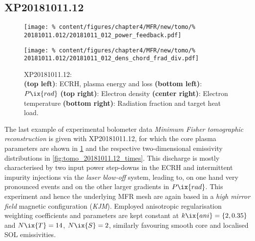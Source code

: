         \subsection*{XP20181011.12}%
%
            \begin{figure}[t]%
                \centering%
                \captionsetup{width=0.49\textwidth}%
                \begin{minipage}[c]{0.49\textwidth}%
                    \centering%
                    \texttt{[image: \%
                        content/figures/chapter4/MFR/new/tomo/\%
                        20181011.012/20181011\_012\_power\_feedback.pdf]}%
                    \caption{%
                        XP20181011.12:\\%
                        \textbf{(top left)}: ECRH, plasma energy and loss \textbf{(bottom left)}: $P\ix{rad}$ \textbf{(top right)}: Electron density \textbf{(center right)}: Electron temperature \textbf{(bottom right)}: Radiation fraction and target heat load.}\label{fig:20181011.12_PDF}%
                \end{minipage}%
                \hfill%
                \begin{minipage}[c]{0.49\textwidth}%
                    \centering%
                    \texttt{[image: \%
                        content/figures/chapter4/MFR/new/tomo/\%
                        20181011.012/20181011\_012\_dens\_chord\_frad\_div.pdf]}%
                \end{minipage}%
            \end{figure}%
%
            The last example of experimental bolometer data \textit{Minimum Fisher tomographic reconstruction} is given with XP20181011.12, for which the core plasma parameters are shown in \cref{fig:20181011.12_PDF} and the respective two-dimensional emissivity distributions in \cref{fig:tomo_20181011.12_times}. This discharge is mostly characterised by two input power step-downs in the ECRH and intermittent impurity injections via the \textit{laser blow-off} system, leading to, on one hand very pronounced events and on the other larger gradients in $P\ix{rad}$. This experiment and hence the underlying MFR mesh are again based in a \textit{high mirror field} magnetic configuration (\textit{KJM}). Employed anisotropic regularisation weighting coefficients and parameters are kept constant at $k\ix{ani}=\left\{2, 0.35\right\}$ and $N\ix{T}=14$, $N\ix{S}=2$, similarly favouring smooth core and localised SOL emissivities.\\%
